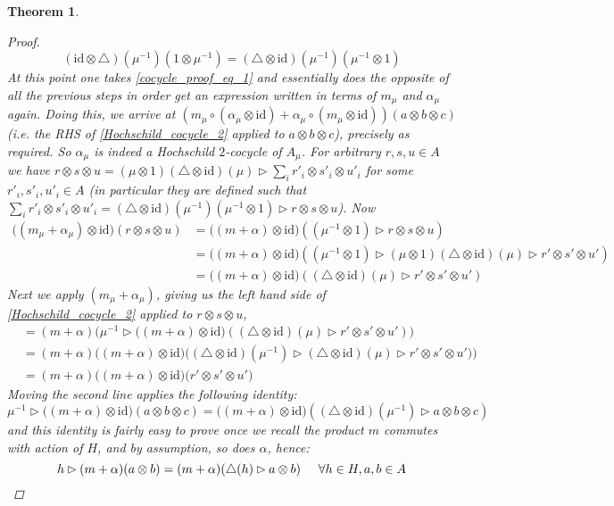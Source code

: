 \documentclass[10pt]{article}
\newcommand{\bb}{\medbreak}
\newcommand{\id}{\text{id}}
\newtheorem{theorem}[lemma]{Theorem}
\theoremstyle{definition}
\begin{document}
\begin{theorem}
\begin{proof}
$$(\id\otimes \triangle)(\mu^{-1})(1\otimes \mu^{-1})=(\triangle\otimes \id)(\mu^{-1})(\mu^{-1}\otimes 1)$$
At this point one takes \eqref{cocycle_proof_eq_1} and essentially does the opposite of all the previous steps in order get an expression written in terms of $m_\mu$ and $\alpha_\mu$ again. Doing this, we arrive at $(m_\mu\circ (\alpha_\mu\otimes \id)+\alpha_\mu\circ (m_\mu\otimes \id))(a\otimes b\otimes c)$ (i.e. the RHS of \eqref{Hochschild_cocycle_2} applied to $a\otimes b\otimes c$), precisely as required. So $\alpha_\mu$ is indeed a Hochschild $2$-cocycle of $A_\mu$.\bb
\iffalse
For arbitrary $r,s,u\in A$ we have $r\otimes s\otimes u=(\mu\otimes 1)(\triangle\otimes \id)(\mu)\rhd \sum_i r'_i\otimes s'_i\otimes u'_i$ for some $r'_i,s'_i,u'_i\in A$ (in particular they are defined such that $\sum_i r'_i\otimes s'_i\otimes u'_i=(\triangle\otimes \id)(\mu^{-1})(\mu^{-1}\otimes 1)\rhd r\otimes s\otimes u$). Now
\begin{align*}
\big((m_\mu+\alpha_\mu)\otimes \id\big)(r\otimes s\otimes u) & =\big((m+\alpha)\otimes \id\big)((\mu^{-1}\otimes 1)\rhd r\otimes s\otimes u)\\
 & =\big((m+\alpha)\otimes \id\big)((\mu^{-1}\otimes 1)\rhd (\mu\otimes 1)(\triangle\otimes \id)(\mu)\rhd r'\otimes s'\otimes u')\\
 & =\big((m+\alpha)\otimes \id\big)((\triangle\otimes \id)(\mu)\rhd r'\otimes s'\otimes u')
\end{align*}
Next we apply $(m_\mu+\alpha_\mu)$, giving us the left hand side of \eqref{Hochschild_cocycle_2} applied to $r\otimes s\otimes u$,
\begin{align*}
 & = (m+\alpha)\bigg(\mu^{-1}\rhd \big((m+\alpha)\otimes \id\big)((\triangle\otimes \id)(\mu)\rhd r'\otimes s'\otimes u')\bigg)\\
 & = (m+\alpha)\big((m+\alpha)\otimes \id\big)\bigg((\triangle\otimes \id)(\mu^{-1})\rhd (\triangle\otimes \id)(\mu)\rhd r'\otimes s'\otimes u') \bigg)\\
 & = (m+\alpha)\big((m+\alpha)\otimes \id\big)\big( r'\otimes s'\otimes u' \big)
\end{align*}
Moving the second line applies the following identity: $$\mu^{-1}\rhd \big((m+\alpha)\otimes \id\big)(a\otimes b\otimes c)=\big((m+\alpha)\otimes \id\big)((\triangle\otimes \id)(\mu^{-1})\rhd a\otimes b\otimes c)$$
and this identity is fairly easy to prove once we recall the product $m$ commutes with action of $H$, and by assumption, so does $\alpha$, hence: 
$$h\rhd (m+\alpha)(a\otimes b)=(m+\alpha)(\triangle(h)\rhd a\otimes b)\hspace{.5cm}\forall h\in H,a,b\in A$$


\end{proof}
\end{theorem}
\end{document}
